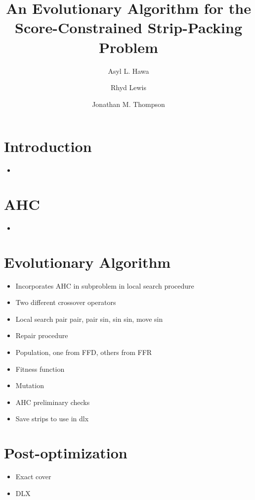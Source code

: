 \documentclass{elsarticle}
\begin{document}
	
\begin{frontmatter}
\title{An Evolutionary Algorithm for the Score-Constrained Strip-Packing Problem}
\author{Asyl L. Hawa}
\author{Rhyd Lewis}
\author{Jonathan M. Thompson}
\address{School of Mathematics, Cardiff University, Senghennydd Road, Cardiff, UK}

\begin{abstract}

\end{abstract}	

\end{frontmatter}


\section{Introduction}
\begin{itemize}
	\item 
\end{itemize}

\section{AHC}
\begin{itemize}
	\item 
\end{itemize}

\section{Evolutionary Algorithm}
\begin{itemize}
	\item Incorporates AHC in subproblem in local search procedure
	\item Two different crossover operators
	\item Local search pair pair, pair sin, sin sin, move sin
	\item Repair procedure
	\item Population, one from FFD, others from FFR
	\item Fitness function
	\item Mutation
	\item AHC preliminary checks
	\item Save strips to use in dlx
\end{itemize}

\section{Post-optimization}
\begin{itemize}
	\item Exact cover
	\item DLX
\end{itemize}
\end{document}
